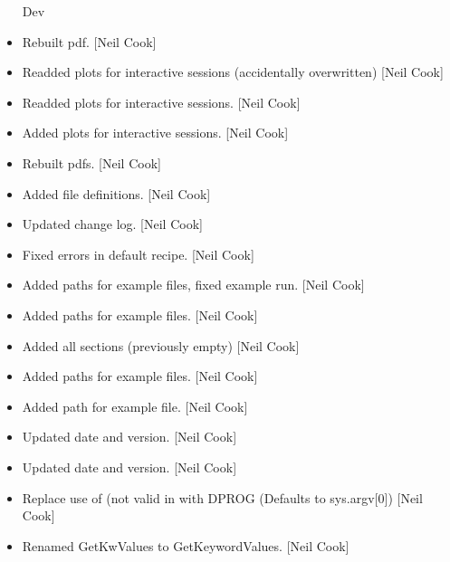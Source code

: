 \documentclass[a4paper,10pt,english]{report}
\begin{document}
\begin{itemize}
Dev

\item {} 
Rebuilt pdf. {[}Neil Cook{]}

\item {} 
Readded  plots for interactive sessions (accidentally
overwritten) {[}Neil Cook{]}

\item {} 
Readded  plots for interactive sessions. {[}Neil Cook{]}

\item {} 
Added  plots for interactive sessions. {[}Neil Cook{]}

\item {} 
Rebuilt pdfs. {[}Neil Cook{]}

\item {} 
Added  file definitions. {[}Neil Cook{]}

\item {} 
Updated  change log. {[}Neil Cook{]}

\item {} 
Fixed errors in default recipe. {[}Neil Cook{]}

\item {} 
Added paths for example files, fixed example run. {[}Neil Cook{]}

\item {} 
Added paths for example files. {[}Neil Cook{]}

\item {} 
Added all sections (previously empty) {[}Neil Cook{]}

\item {} 
Added paths for example files. {[}Neil Cook{]}

\item {} 
Added path for example file. {[}Neil Cook{]}

\item {} 
Updated date and version. {[}Neil Cook{]}

\item {} 
Updated date and version. {[}Neil Cook{]}

\item {} 
Replace use of  (not valid in  with DPROG
(Defaults to sys.argv{[}0{]}) {[}Neil Cook{]}

\item {} 
Renamed GetKwValues to GetKeywordValues. {[}Neil Cook{]}


\end{itemize}
\end{document}
